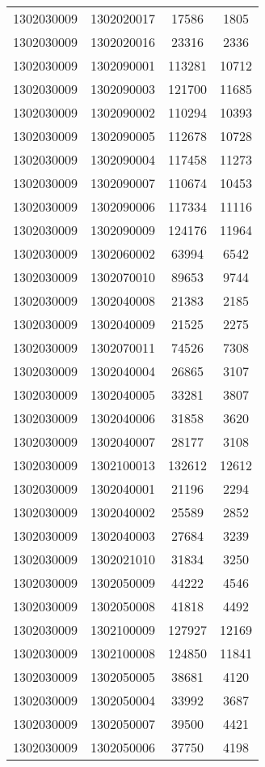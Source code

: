 \begin{longtable}{llcc}
1302030009 & 1302020017 & 17586 & 1805\\
1302030009 & 1302020016 & 23316 & 2336\\
1302030009 & 1302090001 & 113281 & 10712\\
1302030009 & 1302090003 & 121700 & 11685\\
1302030009 & 1302090002 & 110294 & 10393\\
1302030009 & 1302090005 & 112678 & 10728\\
1302030009 & 1302090004 & 117458 & 11273\\
1302030009 & 1302090007 & 110674 & 10453\\
1302030009 & 1302090006 & 117334 & 11116\\
1302030009 & 1302090009 & 124176 & 11964\\
1302030009 & 1302060002 & 63994 & 6542\\
1302030009 & 1302070010 & 89653 & 9744\\
1302030009 & 1302040008 & 21383 & 2185\\
1302030009 & 1302040009 & 21525 & 2275\\
1302030009 & 1302070011 & 74526 & 7308\\
1302030009 & 1302040004 & 26865 & 3107\\
1302030009 & 1302040005 & 33281 & 3807\\
1302030009 & 1302040006 & 31858 & 3620\\
1302030009 & 1302040007 & 28177 & 3108\\
1302030009 & 1302100013 & 132612 & 12612\\
1302030009 & 1302040001 & 21196 & 2294\\
1302030009 & 1302040002 & 25589 & 2852\\
1302030009 & 1302040003 & 27684 & 3239\\
1302030009 & 1302021010 & 31834 & 3250\\
1302030009 & 1302050009 & 44222 & 4546\\
1302030009 & 1302050008 & 41818 & 4492\\
1302030009 & 1302100009 & 127927 & 12169\\
1302030009 & 1302100008 & 124850 & 11841\\
1302030009 & 1302050005 & 38681 & 4120\\
1302030009 & 1302050004 & 33992 & 3687\\
1302030009 & 1302050007 & 39500 & 4421\\
1302030009 & 1302050006 & 37750 & 4198\\

\end{longtable}

